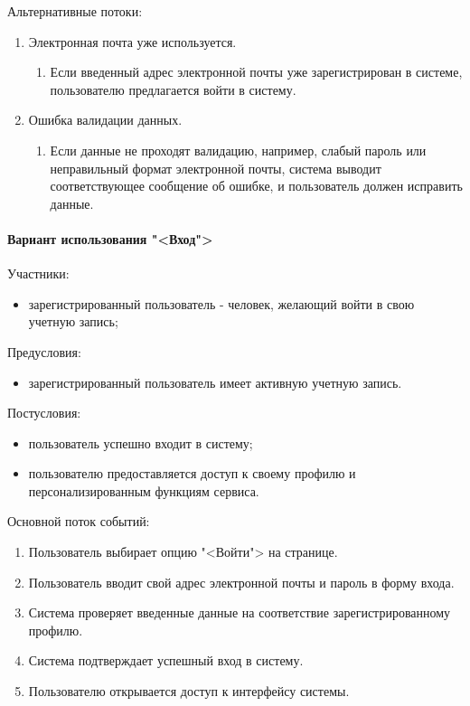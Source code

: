 Альтернативные потоки:
\begin{enumerate}
	\item Электронная почта уже используется.
	\begin{enumerate}
		\item Если введенный адрес электронной почты уже зарегистрирован в системе, пользователю предлагается войти в систему.
	\end{enumerate}
	
	\item Ошибка валидации данных.
	\begin{enumerate}
		\item Если данные не проходят валидацию, например, слабый пароль или неправильный формат электронной почты, система выводит соответствующее сообщение об ошибке, и пользователь должен исправить данные.
	\end{enumerate}
\end{enumerate}

\paragraph{Вариант использования "<Вход">}

Участники:
\begin{itemize}
	\item зарегистрированный пользователь - человек, желающий войти в свою учетную запись;
\end{itemize}

Предусловия:
\begin{itemize}
	\item зарегистрированный пользователь имеет активную учетную запись.
\end{itemize}

Постусловия:
\begin{itemize}
	\item пользователь успешно входит в систему;
	\item пользователю предоставляется доступ к своему профилю и персонализированным функциям сервиса.
\end{itemize}

Основной поток событий:
\begin{enumerate}
	\item Пользователь выбирает опцию "<Войти"> на странице.
	\item Пользователь вводит свой адрес электронной почты и пароль в форму входа.
	\item Система проверяет введенные данные на соответствие зарегистрированному профилю.
	\item Система подтверждает успешный вход в систему.
	\item Пользователю открывается доступ к интерфейсу системы.
\end{enumerate}

